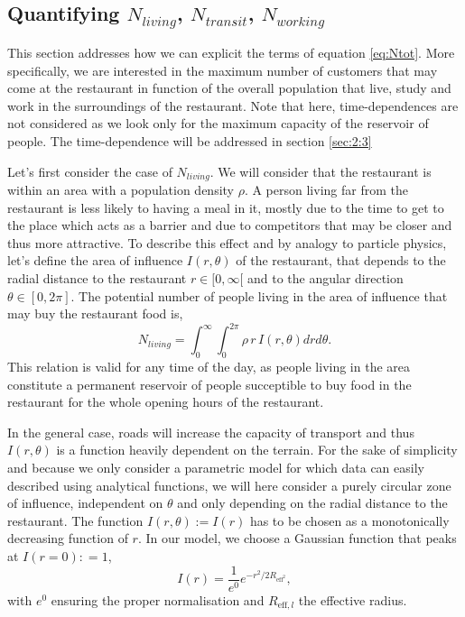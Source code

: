 \documentclass{article}
\begin{document}
    \subsection{Quantifying $N_{living}$, $N_{transit}$, $N_{working}$} \label{sec:2:2}

This section addresses how we can explicit the terms of equation \ref{eq:Ntot}. More specifically, we are interested in the maximum number of customers that may come at the restaurant in function of the overall population that live, study and work in the surroundings of the restaurant. 
Note that here, time-dependences are not considered as we look only for the maximum capacity of the reservoir of people. The time-dependence will be addressed in section \ref{sec:2:3}

Let's first consider the case of $N_{living}$.  We will consider that the restaurant is within an area with a population density $\rho$. A person living far from the restaurant is less likely to having a meal in it, mostly due to the time to get to the place which acts as a barrier and due to competitors that may be closer and thus more attractive. To describe this effect and by analogy to particle physics, let's define the area of influence $I(r, \theta)$ of the restaurant, that depends to the radial distance to the restaurant $r \in [0, \infty[$ and to the angular direction $\theta \in [0, 2\pi]$.  The potential number of people living in the area of influence that may buy the restaurant food is,
\begin{equation} \label{eq:Nliving}
    N_{living} = \int^{\infty}_{0}\int^{2\pi}_{0} \rho \, r\, I(r, \theta) dr d\theta.
\end{equation}
This relation is valid for any time of the day, as people living in the area constitute a permanent reservoir of people succeptible to buy food in the restaurant for the whole opening hours of the restaurant. 

In the general case, roads will increase the capacity of transport and thus $I(r, \theta)$ is a function heavily dependent on the terrain. 
For the sake of simplicity and because we only consider a parametric model for which data can easily described using analytical functions, we will here consider a purely circular zone of influence, independent on $\theta$ and only depending on the radial distance to the restaurant. The function $I(r, \theta) := I(r)$ has to be chosen as a monotonically decreasing function of $r$. In our model, we choose a Gaussian function that peaks at $I(r=0) : = 1$,
\begin{equation} \label{eq:Ir}
    I(r) = \frac{1}{e^{0}} e^{-r^2/2 R_{\mathrm{eff}^2}},
\end{equation}
with $e^0$ ensuring the proper normalisation and $R_{\mathrm{eff},l}$ the effective radius.
\end{document}
